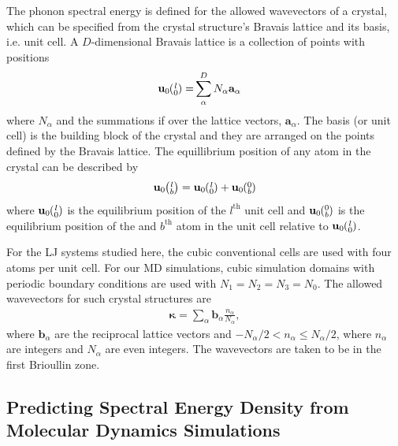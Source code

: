 \documentclass[letterpaper,12pt]{article}
\newcommand{\ab}[2]{\mspace{-4.0mu}\left(\mspace{-8.0mu}\begin{smallmatrix}&\ifthenelse{\equal{#1}{}}{a}{#1} \\&\ifthenelse{\equal{#2}{}}{b}{#2}\end{smallmatrix}\mspace{-3.0mu}\right)}
\begin{document}
The phonon spectral energy is defined for the allowed wavevectors of a crystal, which can be specified from the crystal structure's Bravais lattice and its basis, i.e. unit cell. A $D$-dimensional Bravais lattice is a collection of points with
positions
\begin{equation}\label{crys_pos}
\begin{split}
\mathbf{u}_0\ab{l}{0} =& \sum^D_{\alpha} N_{\alpha}\mathbf{a}_{\alpha}
\end{split}
\end{equation}
where $N_{\alpha}$ and the summations if over the lattice vectors, $\mathbf{a}_{\alpha}$.\cite{ashcroft1976} The basis (or unit cell) is the building block of the crystal and they are arranged on the points defined by the Bravais lattice. The equillibrium position of any atom in the crystal can be described by
\begin{equation}\label{crys_pos2}
\begin{split}
\mathbf{u}_0\ab{l}{b} = \mathbf{u}_0\ab{l}{0} + \mathbf{u}_0\ab{0}{b}
\end{split}
\end{equation}
where $\mathbf{u}_0\ab{l}{0}$ is the equilibrium position of the $l^{\textrm{th}}$ unit cell and $\mathbf{u}_0\ab{0}{b}$ is the equilibrium position of the and $b^{\textrm{th}}$ atom in the unit cell relative to $\mathbf{u}_0\ab{l}{0}$.

For the LJ systems studied here, the cubic conventional cells are used with four atoms per unit cell.\cite{ashcroft1976} For our MD simulations, cubic simulation domains with periodic boundary conditions are used with $N_1 = N_2 = N_3 = N_0$.\cite{turney2009a,mcgaughey2004a} The allowed wavevectors for such crystal structures are
\begin{equation}\label{crys_pos3}
\begin{split}
\pmb{\kappa} = \sum_{\alpha} \mathbf{b}_{\alpha} \frac{n_{\alpha}}{N_{\alpha}},
\end{split}
\end{equation}
where $\mathbf{b}_{\alpha}$ are the reciprocal lattice vectors\cite{ashcroft1976} and $-N_{\alpha}/2 < n_{\alpha} \leq N_{\alpha}/2$, where $n_{\alpha}$ are integers and $N_{\alpha}$ are even integers.\cite{turney2009a} The wavevectors are taken to be in the first Brioullin zone.\cite{ashcroft1976}

\subsection{\label{A-SED-MD}Predicting Spectral Energy Density from Molecular Dynamics Simulations}
\end{document}
